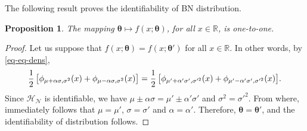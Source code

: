 \documentclass[12pt]{article}
\newtheorem{proposition}[theorem]{Proposition}
\theoremstyle{definition}
\begin{document}
The following result proves the identifiability of BN distribution.
\begin{proposition}
	The mapping $\boldsymbol{\theta} \longmapsto f(x;\boldsymbol{\theta})$, for all $x\in\mathbb{R}$, is one-to-one.
\end{proposition}
\begin{proof}
Let us suppose that $f(x;\boldsymbol{\theta})=f(x;\boldsymbol{\theta}')$ for all $x\in\mathbb{R}$. In other words, by \eqref{eq-eq-dens},
\begin{align*}
{1\over 2}\, 
\big[\phi_{\mu+\alpha\sigma, \sigma^2 }(x)
+
\phi_{\mu-\alpha\sigma, \sigma^2}(x)\big]
=
{1\over 2}\, 
\big[\phi_{\mu'+\alpha'\sigma', \sigma'^2 }(x)
+
\phi_{\mu'-\alpha'\sigma', \sigma'^2}(x)\big].
\end{align*}
Since $\mathcal{H}_{\mathcal{N}}$ is identifiable, we have
$\mu\pm\alpha\sigma=\mu'\pm\alpha'\sigma'$ and $\sigma^2=\sigma'^2$.  From where, immediately follows that $\mu=\mu'$, $\sigma=\sigma'$ and $\alpha=\alpha'$. Therefore, $\boldsymbol{\theta}=\boldsymbol{\theta}'$, and the identifiability of distribution follows.
\end{proof}
\end{document}
